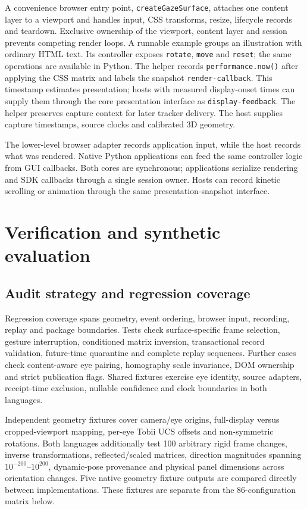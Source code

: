 \documentclass[sigconf,screen,nonacm]{acmart}
\newcommand{\code}[1]{\texttt{#1}}
\begin{document}
A convenience browser entry point, \code{createGazeSurface}, attaches one content
layer to a viewport and handles input, CSS transforms, resize, lifecycle records
and teardown. Exclusive ownership of the viewport, content layer and session
prevents competing render loops. A runnable example groups an illustration with ordinary HTML text.
Its controller exposes \code{rotate}, \code{move} and \code{reset}; the same
operations are available in Python. The helper records \code{performance.now()}
after applying the CSS matrix and labels the snapshot \code{render-callback}.
This timestamp estimates presentation; hosts with measured display-onset times
can supply them through the core presentation interface as \code{display-feedback}.
The helper preserves capture context for later tracker delivery. The host
supplies capture timestamps, source clocks and calibrated 3D geometry.

The lower-level browser adapter records application input, while the host records what was
rendered. Native Python applications can feed the same controller logic from
GUI callbacks. Both cores are synchronous; applications serialize rendering and
SDK callbacks through a single session owner. Hosts can record kinetic scrolling
or animation through the same presentation-snapshot interface.

\section{Verification and synthetic evaluation}
\subsection{Audit strategy and regression coverage}
Regression coverage spans geometry, event ordering, browser input, recording,
replay and package boundaries. Tests check surface-specific frame selection,
gesture interruption, conditioned matrix inversion, transactional record
validation, future-time quarantine and complete replay sequences. Further cases
check content-aware eye pairing, homography scale invariance, DOM ownership and
strict publication flags. Shared fixtures exercise eye identity, source adapters,
receipt-time exclusion, nullable confidence and clock boundaries in both languages.

Independent geometry fixtures cover camera/eye origins,
full-display versus cropped-viewport mapping, per-eye Tobii UCS offsets and
non-symmetric rotations. Both languages additionally test 100 arbitrary rigid
frame changes, inverse transformations, reflected/scaled matrices, direction
magnitudes spanning $10^{-200}$--$10^{200}$, dynamic-pose provenance and physical
panel dimensions across orientation changes. Five native geometry fixture
outputs are compared directly between implementations. These fixtures are
separate from the 86-configuration matrix below.
\end{document}
